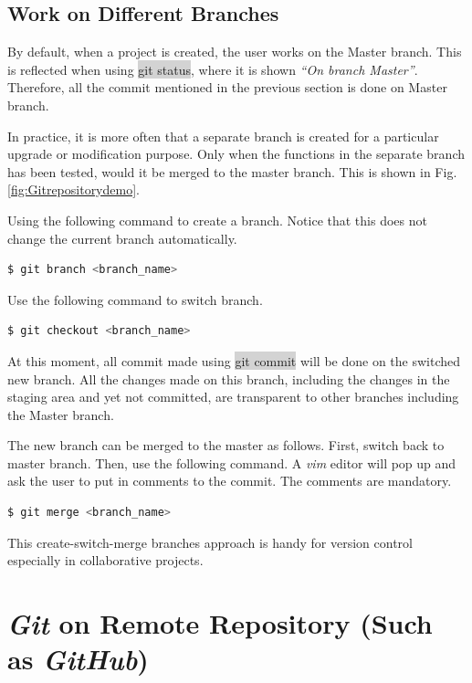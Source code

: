 \documentclass[a4paper]{article}
\begin{document}
\subsection{Work on Different Branches}

By default, when a project is created, the user works on the Master branch. This is reflected when using \colorbox{lightgray}{git status}, where it is shown \textit{``On branch Master''}. Therefore, all the commit mentioned in the previous section is done on Master branch.

In practice, it is more often that a separate branch is created for a particular upgrade or modification purpose. Only when the functions in the separate branch has been tested, would it be merged to the master branch. This is shown in Fig. \ref{fig:Gitrepositorydemo}.

Using the following command to create a branch. Notice that this does not change the current branch automatically.
\begin{lstlisting}[backgroundcolor = \color{lightgray},language=bash]
  $ git branch <branch_name>
\end{lstlisting}

Use the following command to switch branch.
\begin{lstlisting}[backgroundcolor = \color{lightgray},language=bash]
  $ git checkout <branch_name>
\end{lstlisting}

At this moment, all commit made using \colorbox{lightgray}{git commit} will be done on the switched new branch. All the changes made on this branch, including the changes in the staging area and yet not committed, are transparent to other branches including the Master branch.

The new branch can be merged to the master as follows. First, switch back to master branch. Then, use the following command. A \textit{vim} editor will pop up and ask the user to put in comments to the commit. The comments are mandatory.
\begin{lstlisting}[backgroundcolor = \color{lightgray},language=bash]
  $ git merge <branch_name>
\end{lstlisting}

This create-switch-merge branches approach is handy for version control especially in collaborative projects.

\section{\textit{Git} on Remote Repository (Such as \textit{GitHub})}
\end{document}
